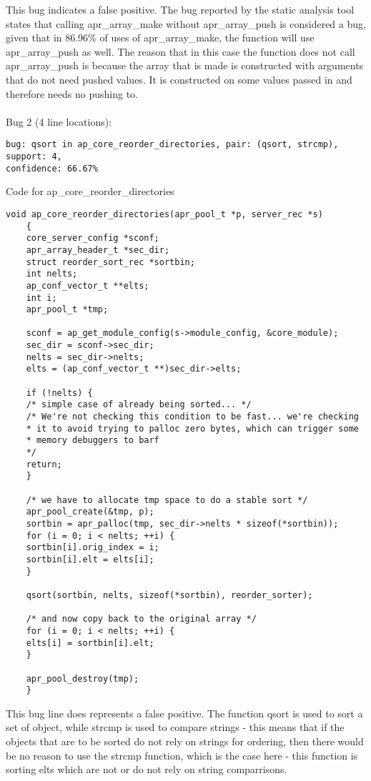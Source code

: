 \documentclass[12pt]{article}
\begin{document}
This bug indicates a false positive. The bug reported by the static analysis tool states that calling apr\_array\_make without apr\_array\_push is considered a bug, given that in 86.96\% of uses of apr\_array\_make, the function will use apr\_array\_push as well. The reason that in this case the function does not call apr\_array\_push is because the array that is made is constructed with arguments that do not need pushed values. It is constructed on some values passed in and therefore needs no pushing to.\\\\
Bug 2 (4 line locations):
\begin{lstlisting}
bug: qsort in ap_core_reorder_directories, pair: (qsort, strcmp), support: 4,
confidence: 66.67%
\end{lstlisting}
Code for ap\_core\_reorder\_directories
\begin{lstlisting}
void ap_core_reorder_directories(apr_pool_t *p, server_rec *s)
	{
	core_server_config *sconf;
	apr_array_header_t *sec_dir;
	struct reorder_sort_rec *sortbin;
	int nelts;
	ap_conf_vector_t **elts;
	int i;
	apr_pool_t *tmp;
	
	sconf = ap_get_module_config(s->module_config, &core_module);
	sec_dir = sconf->sec_dir;
	nelts = sec_dir->nelts;
	elts = (ap_conf_vector_t **)sec_dir->elts;
	
	if (!nelts) {
	/* simple case of already being sorted... */
	/* We're not checking this condition to be fast... we're checking
	* it to avoid trying to palloc zero bytes, which can trigger some
	* memory debuggers to barf
	*/
	return;
	}
	
	/* we have to allocate tmp space to do a stable sort */
	apr_pool_create(&tmp, p);
	sortbin = apr_palloc(tmp, sec_dir->nelts * sizeof(*sortbin));
	for (i = 0; i < nelts; ++i) {
	sortbin[i].orig_index = i;
	sortbin[i].elt = elts[i];
	}
	
	qsort(sortbin, nelts, sizeof(*sortbin), reorder_sorter);
	
	/* and now copy back to the original array */
	for (i = 0; i < nelts; ++i) {
	elts[i] = sortbin[i].elt;
	}
	
	apr_pool_destroy(tmp);
	}
\end{lstlisting}

This bug line does represents a false positive. The function qsort is used to sort a set of object, while strcmp is used to compare strings - this means that if the objects that are to be sorted do not rely on strings for ordering, then there would be no reason to use the strcmp function, which is the case here - this function is sorting elts which are not or do not rely on string comparrisons.
\end{document}
